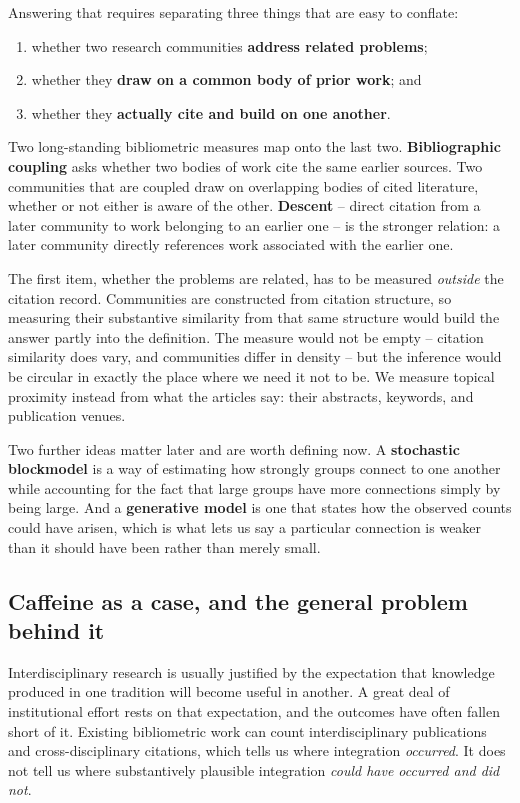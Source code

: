 \documentclass[11pt]{article}
\begin{document}
Answering that requires separating three things that are easy to conflate:

\begin{enumerate}[leftmargin=2em]
  \item whether two research communities \textbf{address related problems};
  \item whether they \textbf{draw on a common body of prior work}; and
  \item whether they \textbf{actually cite and build on one another}.
\end{enumerate}

Two long-standing bibliometric measures map onto the last two.
\textbf{Bibliographic coupling} asks whether two bodies of work cite the same earlier
sources. Two communities that are coupled draw on overlapping bodies of cited literature,
whether or not either is aware of the other. \textbf{Descent} -- direct citation from a
later community to work belonging to an earlier one -- is the stronger relation: a later
community directly references work associated with the earlier one.

The first item, whether the problems are related, has to be measured \emph{outside} the
citation record. Communities are constructed from citation structure, so measuring their
substantive similarity from that same structure would build the answer partly into the
definition. The measure would not be empty -- citation similarity does vary, and
communities differ in density -- but the inference would be circular in exactly the place
where we need it not to be. We measure topical proximity instead from what the articles
say: their abstracts, keywords, and publication venues.

Two further ideas matter later and are worth defining now. A
\textbf{stochastic blockmodel} is a way of estimating how strongly groups connect to one
another while accounting for the fact that large groups have more connections simply by
being large. And a \textbf{generative model} is one that states how the observed counts
could have arisen, which is what lets us say a particular connection is weaker than it
should have been rather than merely small.

\subsection{Caffeine as a case, and the general problem behind it}

Interdisciplinary research is usually justified by the expectation that knowledge
produced in one tradition will become useful in another. A great deal of institutional
effort rests on that expectation, and the outcomes have often fallen short of it.
Existing bibliometric work can count interdisciplinary publications and cross-disciplinary
citations, which tells us where integration \emph{occurred}. It does not tell us where
substantively plausible integration \emph{could have occurred and did not}.
\end{document}
